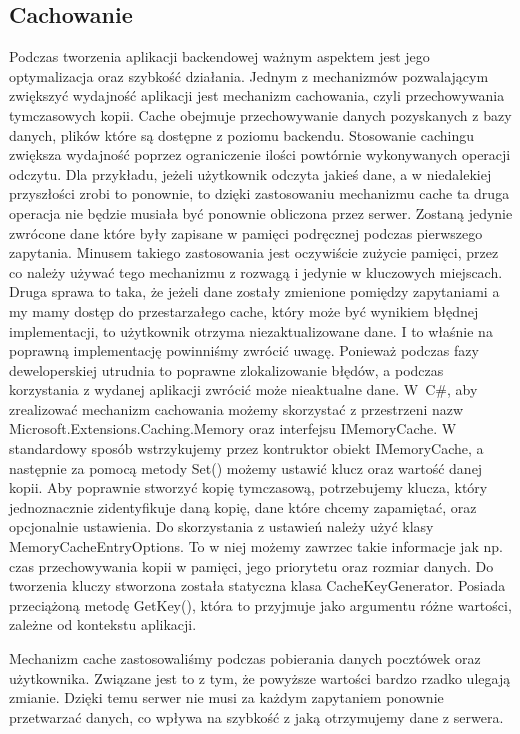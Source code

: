 \documentclass[a4paper,twoside,12pt]{book}
\begin{document}
\subsection{Cachowanie} 
Podczas tworzenia aplikacji backendowej ważnym aspektem jest jego optymalizacja oraz szybkość działania. Jednym z mechanizmów pozwalającym zwiększyć wydajność aplikacji jest mechanizm cachowania, czyli przechowywania tymczasowych kopii. Cache obejmuje przechowywanie danych pozyskanych z bazy danych, plików które są dostępne z poziomu backendu. Stosowanie cachingu zwiększa wydajność poprzez ograniczenie ilości powtórnie wykonywanych operacji odczytu. Dla przykładu, jeżeli użytkownik odczyta jakieś dane, a w niedalekiej przyszłości zrobi to ponownie, to dzięki zastosowaniu mechanizmu cache ta druga operacja nie będzie musiała być ponownie obliczona przez serwer. Zostaną jedynie zwrócone dane które były zapisane w pamięci podręcznej podczas pierwszego zapytania. Minusem takiego zastosowania jest oczywiście zużycie pamięci, przez co należy używać tego mechanizmu z rozwagą i jedynie w kluczowych miejscach. Druga sprawa to taka, że jeżeli dane zostały zmienione pomiędzy zapytaniami a my mamy dostęp do przestarzałego cache, który może być wynikiem błędnej implementacji, to użytkownik otrzyma niezaktualizowane dane. I to właśnie na poprawną implementację powinniśmy zwrócić uwagę. Ponieważ podczas fazy deweloperskiej utrudnia to poprawne zlokalizowanie błędów, a podczas korzystania z wydanej aplikacji zwrócić może nieaktualne dane. 
W~C\#, aby zrealizować mechanizm cachowania możemy skorzystać z przestrzeni nazw Microsoft.Extensions.Caching.Memory oraz interfejsu IMemoryCache. W standardowy sposób wstrzykujemy przez kontruktor obiekt IMemoryCache, a następnie za pomocą metody Set() możemy ustawić klucz oraz wartość danej kopii. Aby poprawnie stworzyć kopię tymczasową, potrzebujemy klucza, który jednoznacznie zidentyfikuje daną kopię, dane które chcemy zapamiętać, oraz opcjonalnie ustawienia. Do skorzystania z ustawień należy użyć klasy MemoryCacheEntryOptions. To w niej możemy zawrzec takie informacje jak np. czas przechowywania kopii w pamięci, jego priorytetu oraz rozmiar danych. Do tworzenia kluczy stworzona została statyczna klasa CacheKeyGenerator. Posiada przeciążoną metodę GetKey(), która to przyjmuje jako argumentu różne wartości, zależne od kontekstu aplikacji. 

Mechanizm cache zastosowaliśmy podczas pobierania danych pocztówek oraz użytkownika. Związane jest to z tym, że powyższe wartości bardzo rzadko ulegają zmianie. Dzięki temu serwer nie musi za każdym zapytaniem ponownie przetwarzać danych, co wpływa na szybkość z jaką otrzymujemy dane z serwera.
\end{document}
